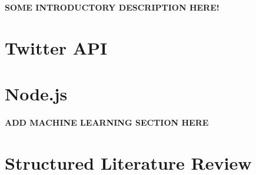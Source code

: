 
\textbf{SOME INTRODUCTORY DESCRIPTION HERE!}

\section{Twitter API}


\section{Node.js}
	


\paragraph{\textbf{ADD MACHINE LEARNING SECTION HERE}}

\section{Structured Literature Review}
